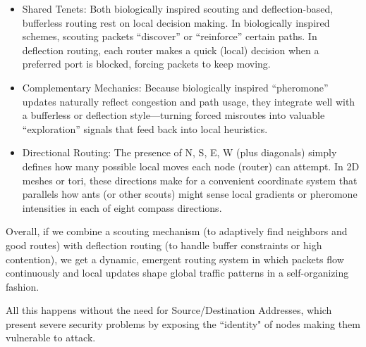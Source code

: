 \documentclass[../../../OAE-SPEC-MAIN.tex]{subfiles}
\begin{document}
\begin{itemize}
\item Shared Tenets: Both biologically inspired scouting and deflection-based, bufferless routing rest on local decision making. In biologically inspired schemes, scouting packets “discover” or “reinforce” certain paths. In deflection routing, each router makes a quick (local) decision when a preferred port is blocked, forcing packets to keep moving.
\item Complementary Mechanics: Because biologically inspired “pheromone” updates naturally reflect congestion and path usage, they integrate well with a bufferless or deflection style—turning forced misroutes into valuable “exploration” signals that feed back into local heuristics.
\item Directional Routing: The presence of N, S, E, W (plus diagonals) simply defines how many possible local moves each node (router) can attempt. In 2D meshes or tori, these directions make for a convenient coordinate system that parallels how ants (or other scouts) might sense local gradients or pheromone intensities in each of eight compass directions.
\end{itemize}

Overall, if we combine a scouting mechanism (to adaptively find neighbors and good routes) with deflection routing (to handle buffer constraints or high contention), we get a dynamic, emergent routing system in which packets flow continuously and local updates shape global traffic patterns in a self-organizing fashion.

All this happens without the need for Source/Destination Addresses, which present severe security problems by exposing the ``identity" of nodes making them vulnerable to attack.
\end{document}
